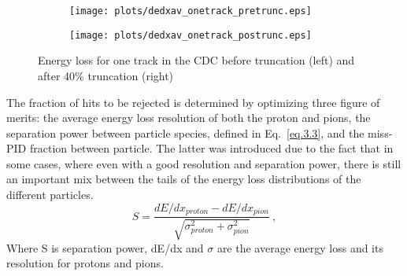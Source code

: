 \begin{figure}[H]
    \centering
    \begin{subfigure}[b]{0.45\textwidth}
        \texttt{[image: plots/dedxav\_onetrack\_pretrunc.eps]}
    \end{subfigure}\hfill
    \begin{subfigure}[b]{0.45\textwidth}
        \texttt{[image: plots/dedxav\_onetrack\_postrunc.eps]}
    \end{subfigure}
    \caption{Energy loss for one track in the CDC before truncation (left) and after 40$\%$ truncation (right)}
    \label{fig.3.3}
\end{figure}
The fraction of hits to be rejected is determined by optimizing three figure of merits: the average energy loss resolution of both the proton and pions, the separation power between particle species, defined in Eq.~\ref{eq.3.3}, and the miss-PID fraction between particle. The latter was introduced due to the fact that in some cases, where even with a good resolution and separation power, there is still an important mix between the tails of the energy loss distributions of the different particles.
\begin{equation}
    \label{eq.3.3}
    S = \frac{dE/dx_{proton} - dE/dx_{pion}}{\sqrt{\sigma_{proton}^2 + \sigma_{pion}^2}}~,
\end{equation}
Where S is separation power, dE/dx and $\sigma$ are the average energy loss and its resolution for protons and pions.
\vspace{-5mm}%
